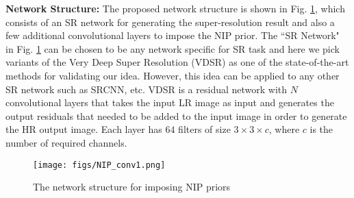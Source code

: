\documentclass[9pt]{article}
\begin{document}





\textbf{Network Structure:} The proposed network structure is shown in Fig. \ref{fig:NIP_network}, which consists of an SR network for generating the super-resolution result and also a few additional convolutional layers to impose the NIP prior.
The ``SR Network" in Fig. \ref{fig:NIP_network} can be chosen to be any network specific for SR task and here we pick variants of the Very Deep Super Resolution (VDSR) \cite{Kim_2016_VDSR} as one of the state-of-the-art methods for validating our idea. However, this idea can be applied to any other SR network such as SRCNN, etc. VDSR  is a residual network with $N$ convolutional layers that takes the input LR image as input and generates the output residuals that needed to be added to the input image in order to generate the HR output image. Each layer has $64$ filters of size $3\times 3\times c$, where $c$ is the number of required channels.


\begin{figure}
  \centering
  \texttt{[image: figs/NIP\_conv1.png]}\vspace{-0.15in}
  \caption{The network structure for imposing NIP priors}
  \label{fig:NIP_network}
\end{figure}
\end{document}
